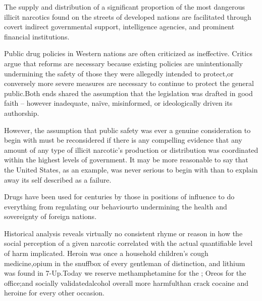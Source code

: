 The supply and distribution of a significant proportion of the most dangerous illicit narcotics found on the streets of developed nations are facilitated through covert indirect governmental support, intelligence agencies, and prominent financial institutions.
\footnotecite[webb1996]

Public drug policies in Western nations are often criticized as ineffective. Critics argue that reforms are necessary because existing policies are unintentionally undermining the safety of those they were allegedly intended to protect, or conversely more severe measures are necessary to continue to protect the general public. Both ends shared the assumption that the legislation was drafted in good faith -- however inadequate, naïve, misinformed, or ideologically driven its authorship. 

However, the assumption that public safety was ever a genuine consideration to begin with must be reconsidered if there is any compelling evidence that any amount of any type of illicit narcotic's production or distribution was coordinated within the highest levels of government. It may be more reasonable to say that the United States, as an example, was never serious to begin with than to explain away its self described  as a failure.

Drugs have been used for centuries by those in positions of influence to do everything from regulating our behaviour\footnotecite[wilson2007] to undermining the health and sovereignty of foreign nations. 

Historical analysis reveals virtually no consistent rhyme or reason in how the social perception of a given narcotic correlated with the actual quantifiable level of harm implicated. Heroin was once a household children's cough medicine, opium in the snuffbox of every gentleman of distinction, and lithium was found in 7-Up. Today we reserve methamphetamine for the ; Oreos for the office; and socially validated alcohol overall more harmful\footnotecite[extras={ See figure 2.}][nutt2010] than crack cocaine and heroine for every other occasion. 

